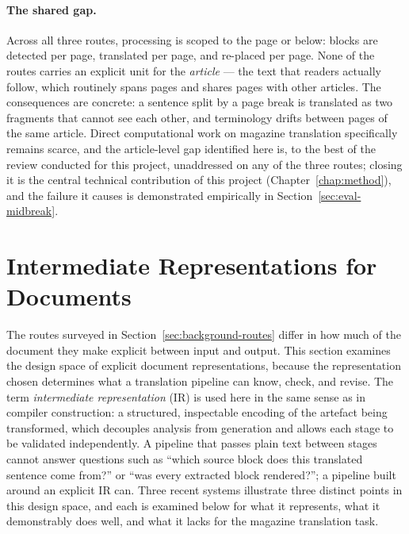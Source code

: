 \paragraph{The shared gap.} Across all three routes, processing is
scoped to the page or below: blocks are detected per page, translated
per page, and re-placed per page. None of the routes carries an
explicit unit for the \emph{article} --- the text that readers
actually follow, which routinely spans pages and shares pages with
other articles. The consequences are concrete: a sentence split by a
page break is translated as two fragments that cannot see each other,
and terminology drifts between pages of the same article. Direct
computational work on magazine translation specifically remains
scarce, and the article-level gap identified here is, to the best of
the review conducted for this project, unaddressed on any of the three
routes; closing it is the central technical contribution of this
project (Chapter~\ref{chap:method}), and the failure it causes is
demonstrated empirically in Section~\ref{sec:eval-midbreak}.

\section{Intermediate Representations for Documents}
\label{sec:background-ir}

The routes surveyed in Section~\ref{sec:background-routes} differ in how much of
the document they make explicit between input and output. This section
examines the design space of explicit document representations, because
the representation chosen determines what a translation pipeline can
know, check, and revise. The term \emph{intermediate representation}
(IR) is used here in the same sense as in compiler construction: a
structured, inspectable encoding of the artefact being transformed,
which decouples analysis from generation and allows each stage to be
validated independently. A pipeline that passes plain text between
stages cannot answer questions such as ``which source block does this
translated sentence come from?'' or ``was every extracted block
rendered?''; a pipeline built around an explicit IR can. Three recent
systems illustrate three distinct points in this design space, and each
is examined below for what it represents, what it demonstrably does
well, and what it lacks for the magazine translation task.

